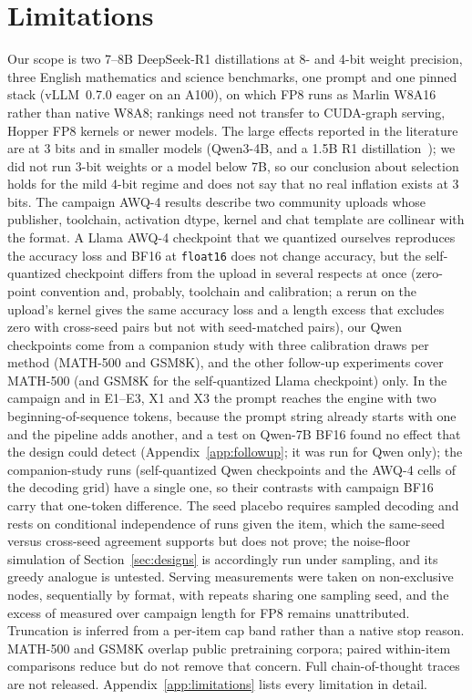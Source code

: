 \documentclass[11pt,a4paper]{article}
\begin{document}
\section{Limitations}
\label{sec:limitations}
Our scope is two 7--8B DeepSeek-R1 distillations at 8- and 4-bit weight precision, three English mathematics and science benchmarks, one prompt and one pinned stack (vLLM~0.7.0 eager on an A100), on which FP8 runs as Marlin W8A16 rather than native W8A8; rankings need not transfer to CUDA-graph serving, Hopper FP8 kernels or newer models. The large effects reported in the literature are at 3 bits and in smaller models (Qwen3-4B, and a 1.5B R1 distillation~\cite{lian2026quantinflates,lotfi2026overthinking}); we did not run 3-bit weights or a model below 7B, so our conclusion about selection holds for the mild 4-bit regime and does not say that no real inflation exists at 3 bits. The campaign AWQ-4 results describe two community uploads whose publisher, toolchain, activation dtype, kernel and chat template are collinear with the format. A Llama AWQ-4 checkpoint that we quantized ourselves reproduces the accuracy loss and BF16 at \texttt{float16} does not change accuracy, but the self-quantized checkpoint differs from the upload in several respects at once (zero-point convention and, probably, toolchain and calibration; a rerun on the upload's kernel gives the same accuracy loss and a length excess that excludes zero with cross-seed pairs but not with seed-matched pairs), our Qwen checkpoints come from a companion study with three calibration draws per method (MATH-500 and GSM8K), and the other follow-up experiments cover MATH-500 (and GSM8K for the self-quantized Llama checkpoint) only. In the campaign and in E1--E3, X1 and X3 the prompt reaches the engine with two beginning-of-sequence tokens, because the prompt string already starts with one and the pipeline adds another, and a test on Qwen-7B BF16 found no effect that the design could detect (Appendix~\ref{app:followup}; it was run for Qwen only); the companion-study runs (self-quantized Qwen checkpoints and the AWQ-4 cells of the decoding grid) have a single one, so their contrasts with campaign BF16 carry that one-token difference. The seed placebo requires sampled decoding and rests on conditional independence of runs given the item, which the same-seed versus cross-seed agreement supports but does not prove; the noise-floor simulation of Section~\ref{sec:designs} is accordingly run under sampling, and its greedy analogue is untested. Serving measurements were taken on non-exclusive nodes, sequentially by format, with repeats sharing one sampling seed, and the excess of measured over campaign length for FP8 remains unattributed. Truncation is inferred from a per-item cap band rather than a native stop reason. MATH-500 and GSM8K overlap public pretraining corpora; paired within-item comparisons reduce but do not remove that concern. Full chain-of-thought traces are not released. Appendix~\ref{app:limitations} lists every limitation in detail.
\end{document}
